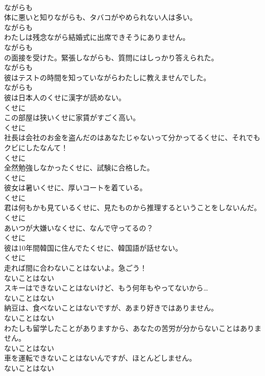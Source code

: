 \documentclass[8pt]{extreport}
\begin{document}
\begin{CJK}{UTF8}{min}
\\	ながらも	
\\	体に悪いと知りながらも、タバコがやめられない人は多い。	
\\	ながらも	
\\	わたしは残念ながら結婚式に出席できそうにありません。	
\\	ながらも	
\\	の面接を受けた。緊張しながらも、質問にはしっかり答えられた。	
\\	ながらも	
\\	彼はテストの時間を知っていながらわたしに教えませんでした。	
\\	ながらも	
\\	彼は日本人のくせに漢字が読めない。	
\\	くせに	
\\	この部屋は狭いくせに家賃がすごく高い。	
\\	くせに	
\\	社長は会社のお金を盗んだのはあなたじゃないって分かってるくせに、それでもクビにしたなんて！	
\\	くせに	
\\	全然勉強しなかったくせに、試験に合格した。	
\\	くせに	
\\	彼女は暑いくせに、厚いコートを着ている。	
\\	くせに	
\\	君は何もかも見ているくせに、見たものから推理するということをしないんだ。	
\\	くせに	
\\	あいつが大嫌いなくせに、なんで守ってるの？	
\\	くせに	
\\	彼は10年間韓国に住んでたくせに、韓国語が話せない。	
\\	くせに	
\\	走れば間に合わないことはないよ。急ごう！	
\\	ないことはない	
\\	スキーはできないことはないけど、もう何年もやってないから…	
\\	ないことはない	
\\	納豆は、食べないことはないですが、あまり好きではありません。	
\\	ないことはない	
\\	わたしも留学したことがありますから、あなたの苦労が分からないことはありません。	
\\	ないことはない	
\\	車を運転できないことはないんですが、ほとんどしません。	
\\	ないことはない	

\end{CJK}
\end{document}
